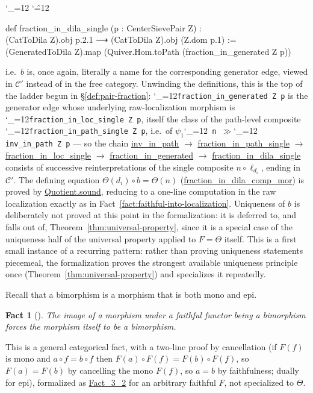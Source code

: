 \documentclass[11pt]{amsart}
\newcommand{\lc}[1]{\url{#1}}
\newcommand{\lcode}{\begingroup\catcode`\_=12\relax\lcodeInner}
\newcommand{\lcodeInner}[1]{\texttt{#1}\endgroup}
\newenvironment{leancode}{%
  \begingroup
  \catcode`\_=12\relax
  \catcode`\^=12\relax
  \small\ttfamily\raggedright\baselineskip=1.15\baselineskip
  \par\smallskip\noindent
}{%
  \par\smallskip
  \endgroup
}
\theoremstyle{plain}
\newtheorem{fact}[theorem]{Fact}
\theoremstyle{definition}
\theoremstyle{remark}
\newcommand{\calC}{\mathcal C}
\begin{document}
\begin{leancode}
def fraction_in_dila_single (p : CenterSievePair Z) : \\
    (CatToDila Z).obj p.2.1 ⟶ (CatToDila Z).obj (Z.dom p.1) := \\
  (GeneratedToDila Z).map (Quiver.Hom.toPath (fraction_in_generated Z p)) \\
\end{leancode}
i.e.\ $b$ is, once again, literally a name for the corresponding generator edge, viewed in
$\calC'$ instead of in the free category. Unwinding the definitions, this is the top of the
ladder begun in \S\ref{def:pair-fraction}: \lcode{fraction_in_generated Z p} is the
generator edge whose underlying raw-localization morphism is
\lcode{fraction_in_loc_single Z p}, itself the class of the path-level composite
\lcode{fraction_in_path_single Z p}, i.e.\ of \ensuremath{\psi_1}\lcode{ n }\ensuremath{\gg}\lcode{ inv_in_path Z p} --- so the
chain \lc{inv_in_path} $\to$ \lc{fraction_in_path_single} $\to$ \lc{fraction_in_loc_single}
$\to$ \lc{fraction_in_generated} $\to$ \lc{fraction_in_dila_single} consists of successive
reinterpretations of the single composite $n \circ \ell_{d_i}$, ending in $\calC'$. The defining equation
$\Theta(d_i) \circ b = \Theta(n)$ (\lc{fraction_in_dila_comp_mor}) is proved by
\lc{Quotient.sound}, reducing to a one-line computation in the raw localization exactly as in
Fact~\ref{fact:faithful-into-localization}. Uniqueness of $b$ is deliberately not
proved at this point in the formalization: it is deferred to, and falls out of,
Theorem~\ref{thm:universal-property}, since it is a special case of the uniqueness half of
the universal property applied to $F = \Theta$ itself. This is a first small instance of a
recurring pattern: rather than proving uniqueness statements piecemeal, the formalization
proves the strongest available uniqueness principle once (Theorem~\ref{thm:universal-property})
and specializes it repeatedly.

Recall that a bimorphism is a morphism that is both mono and epi.

\begin{fact}[{\citep[Fact~3.2]{Mayeux}}]
The image of a morphism under a faithful functor being a bimorphism forces the morphism
itself to be a bimorphism.
\end{fact}

This is a general categorical fact, with a two-line proof by cancellation (if $F(f)$ is mono
and $a\circ f = b\circ f$ then $F(a)\circ F(f) = F(b)\circ F(f)$, so $F(a)=F(b)$ by
cancelling the mono $F(f)$, so $a=b$ by faithfulness; dually for epi), formalized as
\lc{Fact_3_2} for an arbitrary faithful $F$, not specialized to $\Theta$.
\end{document}
